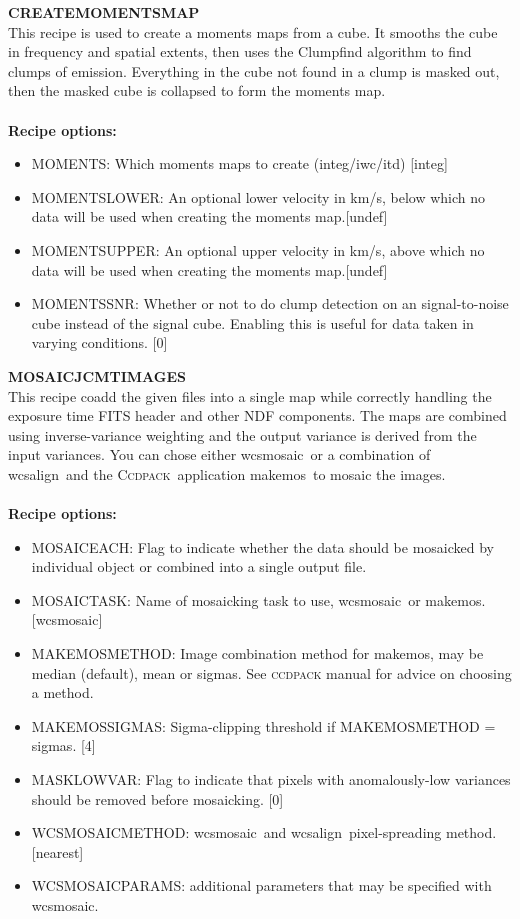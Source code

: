 \documentclass[twoside,11pt]{article}
\newcommand{\xref}[3]{#1}
\renewcommand{\_}{\texttt{\symbol{95}}}
\newcommand{\ccdpack}{\xref{\textsc{Ccdpack}}{sun139}{}}
\newcommand{\task}[1]{\textsf{#1}}
\newcommand{\wcsmosaic}{\xref{\task{wcsmosaic}}{sun95}{WCSMOSAIC}}
\newcommand{\wcsalign}{\xref{\task{wcsalign}}{sun95}{WCSALIGN}}
\newcommand{\makemos}{\xref{\task{makemos}}{sun139}{MAKEMOS}}
\begin{document}
\textbf{CREATE\_MOMENTS\_MAP}\\
This recipe is used to create a moments maps from a cube. It smooths the cube in frequency and spatial extents, then uses the Clumpfind algorithm to find clumps of emission. Everything in the cube not found in a clump is masked out, then the masked cube is collapsed to form the moments map.
\\\\
\textbf{Recipe options:}
\begin{itemize}
\item MOMENTS:  Which moments maps to create (integ/iwc/itd) [integ]
\item MOMENTS\_LOWER: An optional lower velocity in km/s, below which no data will be used when creating the moments map.[undef]
\item MOMENTS\_UPPER: An optional upper velocity in km/s, above which no data will be used when creating the moments map.[undef]
\item MOMENTS\_SNR: Whether or not to do clump detection on an signal-to-noise cube instead of the signal cube. Enabling this is useful for data taken in varying conditions. [0]
\end{itemize}

\textbf{MOSAIC\_JCMT\_IMAGES}\\
This recipe coadd the given files into a single map while correctly handling the exposure time FITS header and other NDF components. The maps are combined using inverse-variance weighting and the output variance is derived from the input variances. You can chose either \wcsmosaic\ or a combination of \wcsalign\ and the \ccdpack\ application \makemos\ to mosaic the images.
\\\\
\textbf{Recipe options:}
\begin{itemize}
\item MOSAIC\_EACH:  Flag to indicate whether the data should be mosaicked by individual object or combined into a single output file.
\item MOSAIC\_TASK: Name of mosaicking task to use, \wcsmosaic\ or \makemos. [wcsmosaic]
\item MAKEMOS\_METHOD: Image combination method for \makemos, may be median (default), mean or sigmas. See \xref{\textsc{ccdpack} manual}{sun139}{} for advice on choosing a method.
\item MAKEMOS\_SIGMAS: Sigma-clipping threshold if MAKEMOS\_METHOD = sigmas. [4]
\item MASK\_LOWVAR: Flag to indicate that pixels with anomalously-low variances should be removed before mosaicking. [0]
\item WCSMOSAIC\_METHOD: \wcsmosaic\ and \wcsalign\ pixel-spreading method. [nearest]
\item WCSMOSAIC\_PARAMS: additional parameters that may be specified with \wcsmosaic. 
\end{itemize}
\end{document}
